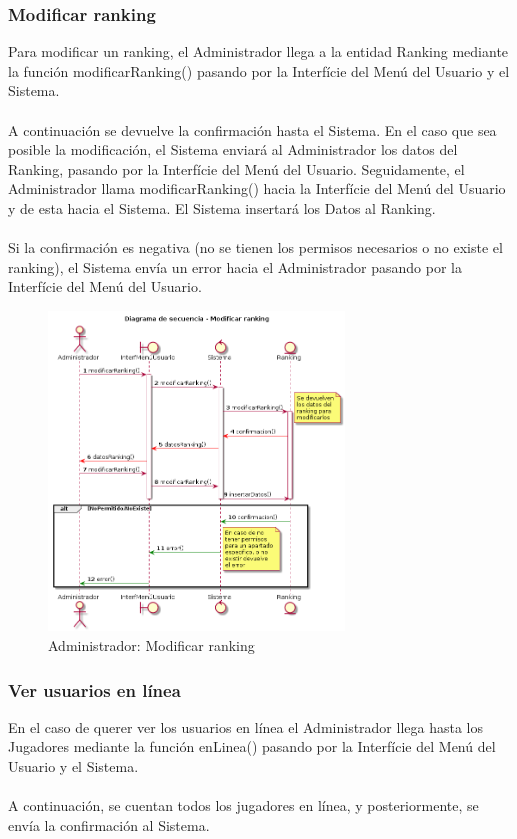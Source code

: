   
\newpage
\subsubsection{Modificar ranking}

  Para modificar un ranking, el Administrador llega a la entidad Ranking mediante la función modificarRanking() pasando por la Interfície del Menú del Usuario y el Sistema.\\
  \\A continuación se devuelve la confirmación hasta el Sistema. En el caso que sea posible la modificación, el Sistema enviará al Administrador los datos del Ranking, pasando por la Interfície del Menú del Usuario. Seguidamente, el Administrador llama modificarRanking() hacia la Interfície del Menú del Usuario y de esta hacia el Sistema. El Sistema insertará los Datos al Ranking.\\
  \\Si la confirmación es negativa (no se tienen los permisos necesarios o no existe el ranking), el Sistema envía un error hacia el Administrador pasando por la Interfície del Menú del Usuario.

 \begin{figure}[ht]
 \centering
 	  \includegraphics[width=0.7\textwidth]{./imatges/administrador/Modificar_ranking.png}
 \caption{Administrador: Modificar ranking}
 \end{figure}

    
\newpage
\subsubsection{Ver usuarios en línea}
	En el caso de querer ver los usuarios en línea el Administrador llega hasta los Jugadores mediante la función enLinea() pasando por la Interfície del Menú del Usuario y el Sistema.\\
	\\A continuación, se cuentan todos los jugadores en línea, y posteriormente, se envía la confirmación al Sistema.
	
